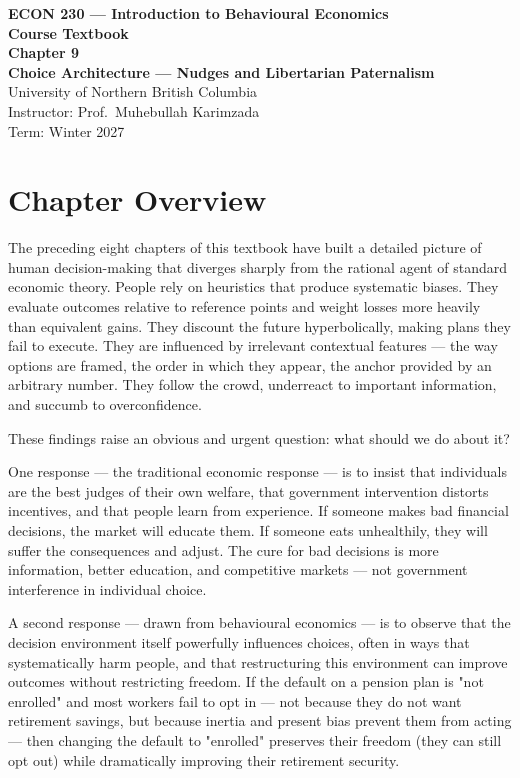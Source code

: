 \documentclass[12pt, letterpaper]{article}
\begin{document}
\begin{titlepage}
\centering\vspace*{3cm}
{\Large\bfseries\color{econblue} ECON 230 --- Introduction to Behavioural Economics\\[1em]}
{\large\bfseries Course Textbook\\[2em]}
{\LARGE\bfseries\color{econblue} Chapter 9\\[0.5em]}
{\Large\bfseries Choice Architecture --- Nudges and Libertarian Paternalism\\[2em]}
\vfill
{\normalsize University of Northern British Columbia\\
Instructor: Prof.\ Muhebullah Karimzada\\
Term: Winter 2027}
\end{titlepage}
\tableofcontents
\newpage


\medskip


\section*{Chapter Overview}


The preceding eight chapters of this textbook have built a detailed picture of human decision-making that diverges sharply from the rational agent of standard economic theory. People rely on heuristics that produce systematic biases. They evaluate outcomes relative to reference points and weight losses more heavily than equivalent gains. They discount the future hyperbolically, making plans they fail to execute. They are influenced by irrelevant contextual features --- the way options are framed, the order in which they appear, the anchor provided by an arbitrary number. They follow the crowd, underreact to important information, and succumb to overconfidence.

These findings raise an obvious and urgent question: what should we do about it?

One response --- the traditional economic response --- is to insist that individuals are the best judges of their own welfare, that government intervention distorts incentives, and that people learn from experience. If someone makes bad financial decisions, the market will educate them. If someone eats unhealthily, they will suffer the consequences and adjust. The cure for bad decisions is more information, better education, and competitive markets --- not government interference in individual choice.

A second response --- drawn from behavioural economics --- is to observe that the decision environment itself powerfully influences choices, often in ways that systematically harm people, and that restructuring this environment can improve outcomes without restricting freedom. If the default on a pension plan is "not enrolled" and most workers fail to opt in --- not because they do not want retirement savings, but because inertia and present bias prevent them from acting --- then changing the default to "enrolled" preserves their freedom (they can still opt out) while dramatically improving their retirement security.
\end{document}
